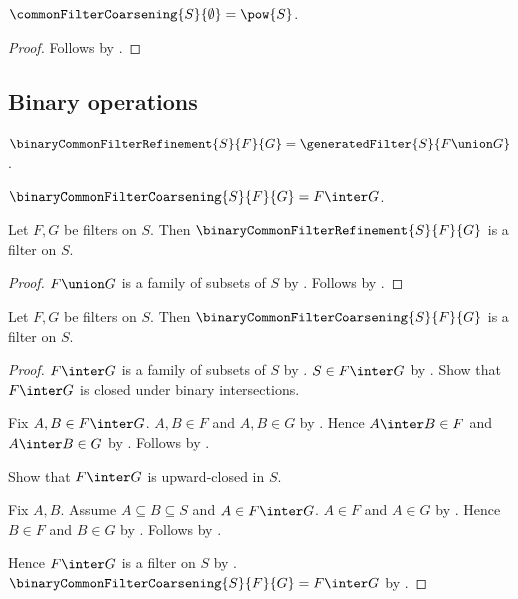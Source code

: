 \begin{proposition}\label{empty_common_filter_coarsening}
    $\commonFilterCoarsening{S}{\emptyset}=\pow{S}$.
\end{proposition}
\begin{proof}
    Follows by
        .
\end{proof}

\subsection{Binary operations}

\begin{definition}\label{binary_common_filter_refinement}
    $\binaryCommonFilterRefinement{S}{F}{G}
        =\generatedFilter{S}{F\union G}$.
\end{definition}

\begin{definition}\label{binary_common_filter_coarsening}
    $\binaryCommonFilterCoarsening{S}{F}{G}=F\inter G$.
\end{definition}

\begin{classification}\label{binary_common_filter_refinement_is_filter}
    Let $F,G$ be filters on $S$.
    Then $\binaryCommonFilterRefinement{S}{F}{G}$ is a filter on $S$.
\end{classification}
\begin{proof}
    $F\union G$ is a family of subsets of $S$ by
        .
    Follows by
        .
\end{proof}

\begin{classification}\label{binary_common_filter_coarsening_is_filter}
    Let $F,G$ be filters on $S$.
    Then $\binaryCommonFilterCoarsening{S}{F}{G}$ is a filter on $S$.
\end{classification}
\begin{proof}
    $F\inter G$ is a family of subsets of $S$ by
        .
    $S\in F\inter G$ by .
    Show that $F\inter G$ is closed under binary intersections.
    \begin{subproof}
        Fix $A,B\in F\inter G$.
        $A,B\in F$ and $A,B\in G$ by .
        Hence $A\inter B\in F$ and $A\inter B\in G$ by
            .
        Follows by .
    \end{subproof}
    Show that $F\inter G$ is upward-closed in $S$.
    \begin{subproof}
        Fix $A,B$.
        Assume $A\subseteq B\subseteq S$ and $A\in F\inter G$.
        $A\in F$ and $A\in G$ by .
        Hence $B\in F$ and $B\in G$ by .
        Follows by .
    \end{subproof}
    Hence $F\inter G$ is a filter on $S$ by .
    $\binaryCommonFilterCoarsening{S}{F}{G}=F\inter G$ by
        .
\end{proof}

